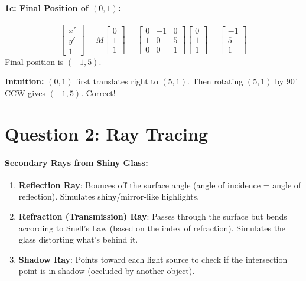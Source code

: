 \documentclass[11pt]{article}
\begin{document}
\paragraph{1c: Final Position of $(0, 1)$:}
\[ \begin{bmatrix} x' \\ y' \\ 1 \end{bmatrix} = M \begin{bmatrix} 0 \\ 1 \\ 1 \end{bmatrix} = \begin{bmatrix} 0 & -1 & 0 \\ 1 & 0 & 5 \\ 0 & 0 & 1 \end{bmatrix} \begin{bmatrix} 0 \\ 1 \\ 1 \end{bmatrix} = \begin{bmatrix} -1 \\ 5 \\ 1 \end{bmatrix} \]
Final position is $\boxed{(-1, 5)}$.

\vspace{1em}
\noindent \textbf{Intuition:} $(0,1)$ first translates right to $(5,1)$. Then rotating $(5,1)$ by $90^\circ$ CCW gives $(-1, 5)$. Correct!

\section*{Question 2: Ray Tracing}

\paragraph{Secondary Rays from Shiny Glass:}

\begin{enumerate}
    \item \textbf{Reflection Ray}: Bounces off the surface angle (angle of incidence = angle of reflection). Simulates shiny/mirror-like highlights.
    \item \textbf{Refraction (Transmission) Ray}: Passes through the surface but bends according to Snell's Law (based on the index of refraction). Simulates the glass distorting what's behind it.
    \item \textbf{Shadow Ray}: Points toward each light source to check if the intersection point is in shadow (occluded by another object).
\end{enumerate}
\end{document}

